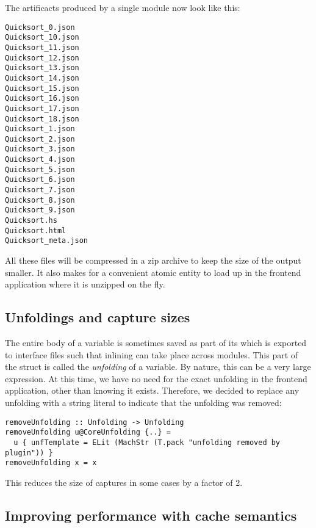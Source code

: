 The artificacts produced by a single module now look like this:

\begin{listing}[H]
\begin{verbatim}
Quicksort_0.json
Quicksort_10.json
Quicksort_11.json
Quicksort_12.json
Quicksort_13.json
Quicksort_14.json
Quicksort_15.json
Quicksort_16.json
Quicksort_17.json
Quicksort_18.json
Quicksort_1.json
Quicksort_2.json
Quicksort_3.json
Quicksort_4.json
Quicksort_5.json
Quicksort_6.json
Quicksort_7.json
Quicksort_8.json
Quicksort_9.json
Quicksort.hs
Quicksort.html
Quicksort_meta.json
\end{verbatim}
\end{listing}

All these files will be compressed in a zip archive to keep the size of the output smaller. It also makes for
a convenient atomic entity to load up in the frontend application where it is unzipped on the fly.

\subsection{Unfoldings and capture sizes}

The entire body of a variable is sometimes saved as part of its  which is exported to interface
files such that inlining can take place across modules. This part of the  struct is called the
\textit{unfolding} of a variable. By nature, this can be a very large expression. At this time, we have no
need for the exact unfolding in the frontend application, other than knowing it exists. Therefore, we decided 
to replace any unfolding with a string literal to indicate that the unfolding was removed:

\begin{listing}[H]
\begin{verbatim}
removeUnfolding :: Unfolding -> Unfolding
removeUnfolding u@CoreUnfolding {..} = 
  u { unfTemplate = ELit (MachStr (T.pack "unfolding removed by plugin")) }
removeUnfolding x = x
\end{verbatim}
\end{listing}

This reduces the size of captures in some cases by a factor of 2.

\subsection{Improving performance with cache semantics}

